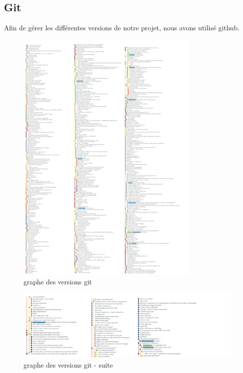 \subsection{Git}

Afin de gérer les différentes versions de notre projet, nous avons utilisé github.



\begin{figure}[h!]
	\centering
	\includegraphics[width=0.8\textwidth]{img/state_git_graph.png}
	\caption{graphe des versions git}
\end{figure}

\newpage
\begin{figure}[h!]
	\centering
	\includegraphics[width=1.0\textwidth]{img/state_git_graph_2.png}
	\caption{graphe des versions git - suite}
\end{figure}